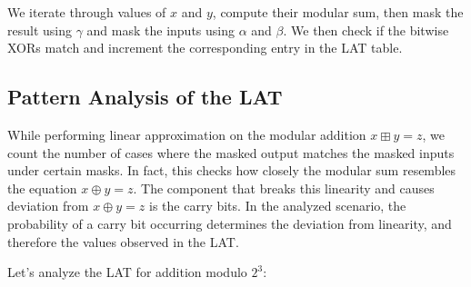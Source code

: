 \documentclass[runningheads]{llncs}
\begin{document}
\vspace{0.2in}

\begin{algorithm}[H]
\caption{Pseudocode for LAT Construction}

\end{algorithm}

\vspace{0.2in}

We iterate through values of \( x \) and \( y \), compute their modular sum, then mask the result using \( \gamma \) and mask the inputs using \( \alpha \) and \( \beta \). We then check if the bitwise XORs match and increment the corresponding entry in the LAT table.

\vspace{2em}

\subsection{Pattern Analysis of the LAT}

While performing linear approximation on the modular addition \( x \boxplus y = z \), we count the number of cases where the masked output matches the masked inputs under certain masks. In fact, this checks how closely the modular sum resembles the equation \( x \oplus y = z \). The component that breaks this linearity and causes deviation from \( x \oplus y = z \) is the carry bits. In the analyzed scenario, the probability of a carry bit occurring determines the deviation from linearity, and therefore the values observed in the LAT.

\vspace{1em}

Let’s analyze the LAT for addition modulo \( 2^3 \):
\end{document}
